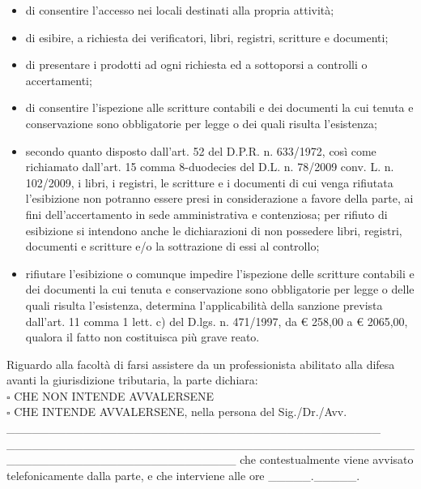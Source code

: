 \documentclass[12pt]{article}
\begin{document}
\begin{itemize}
    \item di consentire l’accesso nei locali destinati alla propria attività;
    \item di esibire, a richiesta dei verificatori, libri, registri, scritture e documenti;
    \item di presentare i prodotti ad ogni richiesta ed a sottoporsi a controlli o accertamenti;
    \item di consentire l’ispezione alle scritture contabili e dei documenti la cui tenuta e conservazione sono obbligatorie per legge o dei quali risulta l’esistenza;
    \item secondo quanto disposto dall’art. 52 del D.P.R. n. 633/1972, così come richiamato dall’art. 15 comma 8-duodecies del D.L. n. 78/2009 conv. L. n. 102/2009, i libri, i registri, le scritture e i documenti di cui venga rifiutata l’esibizione non potranno essere presi in considerazione a favore della parte, ai fini dell’accertamento in sede amministrativa e contenziosa; per rifiuto di esibizione si intendono anche le dichiarazioni di non possedere libri, registri, documenti e scritture e/o la sottrazione di essi al controllo;
    \item rifiutare l’esibizione o comunque impedire l’ispezione delle scritture contabili e dei documenti la cui tenuta e conservazione sono obbligatorie per legge o delle quali risulta l’esistenza, determina l’applicabilità della sanzione prevista dall’art. 11 comma 1 lett. c) del D.lgs. n. 471/1997, da € 258,00 a € 2065,00, qualora il fatto non costituisca più grave reato.
\end{itemize}
Riguardo alla facoltà di farsi assistere da un professionista abilitato alla difesa avanti la giurisdizione tributaria, la parte dichiara:
\\ \begin{math}\square\end{math} CHE NON INTENDE AVVALERSENE
\\ \begin{math}\square\end{math} CHE INTENDE AVVALERSENE, nella persona del Sig./Dr./Avv. \_\_\_\_\_\_\_\_\_\_\_\_\_\_\_\_\_\_\_\_\_\_\_\_\_\_\_\_\_\_\_\_\_\_\_\_\_\_\_\_\_\_\_\_ \\\_\_\_\_\_\_\_\_\_\_\_\_\_\_\_\_\_\_\_\_\_\_\_\_\_\_\_\_\_\_\_\_\_\_\_\_\_\_\_\_\_\_\_\_\_\_\_\_\_\_\_\_\_\_\_\_\_\_\_\_\_\_\_\_\_\_\_\_\_\_\_\_\_\_\_ che contestualmente viene avvisato telefonicamente dalla parte, e che interviene alle ore \_\_\_\_\_.\_\_\_\_\_.
\\ \\
\end{document}
